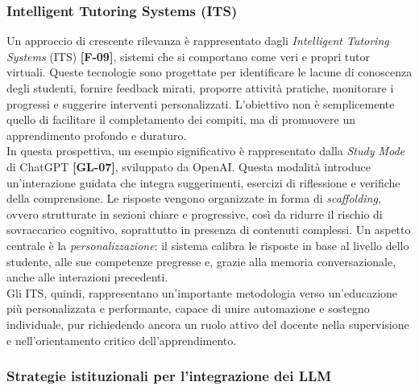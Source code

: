 \documentclass[a4paper,9pt]{article}
\begin{document}
\subsubsection{Intelligent Tutoring Systems (ITS)}

Un approccio di crescente rilevanza è rappresentato dagli \textit{Intelligent Tutoring Systems} (ITS) \textbf{[F-09]}, sistemi che si comportano come veri e propri tutor virtuali. Queste tecnologie sono progettate per identificare le lacune di conoscenza degli studenti, fornire feedback mirati, proporre attività pratiche, monitorare i progressi e suggerire interventi personalizzati. L’obiettivo non è semplicemente quello di facilitare il completamento dei compiti, ma di promuovere un apprendimento profondo e duraturo.\\
In questa prospettiva, un esempio significativo è rappresentato dalla \textit{Study Mode} di ChatGPT \textbf{[GL-07]}, sviluppato da OpenAI. Questa modalità introduce un’interazione guidata che integra suggerimenti, esercizi di riflessione e verifiche della comprensione. Le risposte vengono organizzate in forma di \textit{scaffolding}, ovvero strutturate in sezioni chiare e progressive, così da ridurre il rischio di sovraccarico cognitivo, soprattutto in presenza di contenuti complessi. Un aspetto centrale è la \textit{personalizzazione}: il sistema calibra le risposte in base al livello dello studente, alle sue competenze pregresse e, grazie alla memoria conversazionale, anche alle interazioni precedenti. \\
Gli ITS, quindi, rappresentano un'importante metodologia verso un’educazione più personalizzata e performante, capace di unire automazione e sostegno individuale, pur richiedendo ancora un ruolo attivo del docente nella supervisione e nell’orientamento critico dell’apprendimento.

\subsubsection{Strategie istituzionali per l’integrazione dei LLM}
\end{document}
